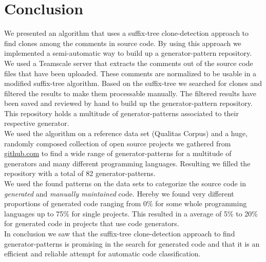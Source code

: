 
\chapter{Conclusion}\label{chapter:conclusion}
We presented an algorithm that uses a suffix-tree clone-detection approach to find clones among the comments in source code. By using this approach we implemented a semi-automatic way to build up a generator-pattern repository.\\
We used a Teamscale server that extracts the comments out of the source code files that have been uploaded. These comments are normalized to be usable in a modified suffix-tree algorithm. Based on the suffix-tree we searched for clones and filtered the results to make them processable manually. The filtered results have been saved and reviewed by hand to build up the generator-pattern repository. This repository holds a multitude of generator-patterns associated to their respective generator.\\
We used the algorithm on a reference data set (Qualitas Corpus) and a huge, randomly composed collection of open source projects we gathered from \href{GitHub}{github.com} to find a wide range of generator-patterns for a multitude of generators and many different programming languages. Resulting we filled the repository with a total of 82 generator-patterns.\\
We used the found patterns on the data sets to categorize the source code in \textit{generated} and \textit{manually maintained} code. Hereby we found very different proportions of generated code ranging from 0\% for some whole programming languages up to 75\% for single projects. This resulted in a average of 5\% to 20\% for generated code in projects that use code generators.\\
In conclusion we saw that the suffix-tree clone-detection approach to find generator-patterns is promising in the search for generated code and that it is an efficient and reliable attempt for automatic code classification.